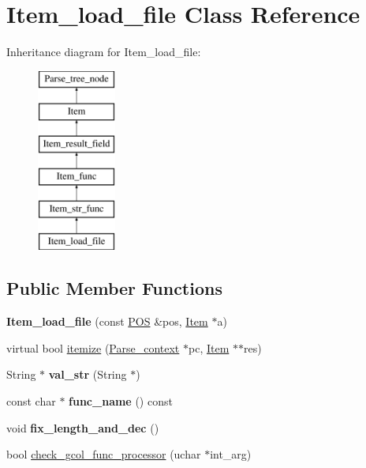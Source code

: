 \hypertarget{classItem__load__file}{}\section{Item\+\_\+load\+\_\+file Class Reference}
\label{classItem__load__file}
Inheritance diagram for Item\+\_\+load\+\_\+file\+:\begin{figure}[H]
\begin{center}
\leavevmode
\includegraphics[height=6.000000cm]{classItem__load__file}
\end{center}
\end{figure}
\subsection*{Public Member Functions}
\begin{DoxyCompactItemize}
\item 
\mbox{\label{classItem__load__file_adcf3fd2a731494ab0c1e2fe2bbe6f946}} 
{\bfseries Item\+\_\+load\+\_\+file} (const \mbox{\hyperlink{structYYLTYPE}{P\+OS}} \&pos, \mbox{\hyperlink{classItem}{Item}} $\ast$a)
\item 
virtual bool \mbox{\hyperlink{classItem__load__file_a3181c3542fe37a8a9b9842beeb384943}{itemize}} (\mbox{\hyperlink{structParse__context}{Parse\+\_\+context}} $\ast$pc, \mbox{\hyperlink{classItem}{Item}} $\ast$$\ast$res)
\item 
\mbox{\label{classItem__load__file_a7666f76280b961dc3a9c82eae0cfa4d9}} 
String $\ast$ {\bfseries val\+\_\+str} (String $\ast$)
\item 
\mbox{\label{classItem__load__file_aa496d487e0450f25e65ab02a8de067ee}} 
const char $\ast$ {\bfseries func\+\_\+name} () const
\item 
\mbox{\label{classItem__load__file_a892a0f33c4aac6f26d39d5b95ffb2e9d}} 
void {\bfseries fix\+\_\+length\+\_\+and\+\_\+dec} ()
\item 
bool \mbox{\hyperlink{classItem__load__file_a1be538400bc26d5fd2f1ee075bb11be5}{check\+\_\+gcol\+\_\+func\+\_\+processor}} (uchar $\ast$int\+\_\+arg)
\end{DoxyCompactItemize}

